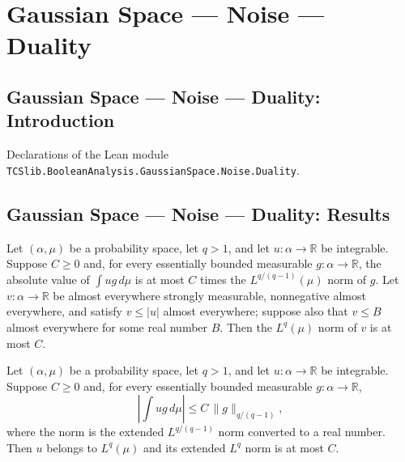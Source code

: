 \section{Gaussian Space --- Noise --- Duality}
\subsection*{Gaussian Space --- Noise --- Duality: Introduction}

Declarations of the Lean module \texttt{TCSlib.BooleanAnalysis.GaussianSpace.Noise.Duality}.

\subsection*{Gaussian Space --- Noise --- Duality: Results}

\begin{lemma}
\label{BooleanAnalysis.GaussianSpace.eLpNorm_le_of_bounded_pairing}
\leanok
{}
Let $(\alpha,\mu)$ be a probability space, let $q>1$, and let $u:\alpha\to\mathbb R$ be
integrable. Suppose $C\ge0$ and, for every essentially bounded measurable
$g:\alpha\to\mathbb R$, the absolute value of $\int u g\,d\mu$ is at most $C$ times the
$L^{q/(q-1)}(\mu)$ norm of $g$. Let $v:\alpha\to\mathbb R$ be almost everywhere strongly
measurable, nonnegative almost everywhere, and satisfy $v\le |u|$ almost everywhere;
suppose also that $v\le B$ almost everywhere for some real number $B$. Then the
$L^q(\mu)$ norm of $v$ is at most $C$.
\end{lemma}

\begin{lemma}
\label{BooleanAnalysis.GaussianSpace.memLp_and_eLpNorm_le_of_bounded_pairing}
\leanok
{}
Let $(\alpha,\mu)$ be a probability space, let $q>1$, and let $u:\alpha\to\mathbb R$ be
integrable. Suppose $C\ge0$ and, for every essentially bounded measurable
$g:\alpha\to\mathbb R$,
\[\left|\int u g\,d\mu\right|\le C\,\|g\|_{q/(q-1)},\]
where the norm is the extended $L^{q/(q-1)}$ norm converted to a real number. Then $u$
belongs to $L^q(\mu)$ and its extended $L^q$ norm is at most $C$.
\end{lemma}
